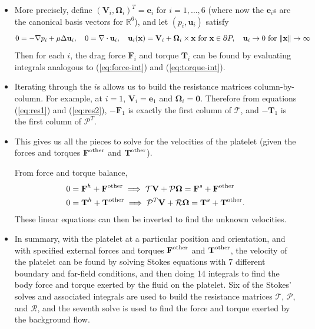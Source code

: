 \documentclass{article}
\newcommand{\tn}{\textnormal}
\newcommand{\vect}[1]{\boldsymbol{\mathbf{#1}}}
\def\R{\mathbb{R}}
\begin{document}
{\begin{itemize}
  Note the change in sign: because of the way the resistance matrices
  are defined, $\mathcal{T} \vect{V}$ is the force exerted \emph{by
    the platelet on the fluid} and $-\mathcal{T} \vect{V}$ is the
  force exerted \emph{by the fluid on the platelet}. 
\item More precisely, define
  $(\vect{V}_i, \vect{\Omega}_i)^T = \vect{e}_i$ for
  $i = 1, \hdots, 6$ (where now the $\vect{e}_i$s are the canonical
  basis vectors for $\R^6$), and let $(p_i, \vect{u}_i)$ satisfy
  \begin{equation}
    \label{eq:unit-cmp}
    0 = -\nabla p_i + \mu \Delta \vect{u}_i, \quad 0 = \nabla
    \cdot \vect{u}_i, \quad \vect{u}_i(\vect{x}) =
    \vect{V}_i + \vect{\Omega}_i \times \vect{x} \tn{
      for } \vect{x} \in \partial P, \quad \vect{u}_i
    \rightarrow 0 \tn{ for } \|\mathbf{x}\| \rightarrow
    \infty
  \end{equation}
  Then for each $i$, the drag force $\vect{F}_i$ and torque
  $\vect{T}_i$ can be found by evaluating integrals analogous to
  (\ref{eq:force-int}) and (\ref{eq:torque-int}).
\item Iterating through the $i$s allows us to build the resistance
  matrices column-by-column. For example, at $i = 1$, $\vect{V}_i =
  \vect{e}_1$ and $\vect{\Omega}_i = \vect{0}$. Therefore from
  equations (\ref{eq:res1}) and (\ref{eq:res2}), $-\vect{F}_1$ is
  exactly the first column of $\mathcal{T}$, and $-\vect{T}_1$ is the
  first column of $\mathcal{P}^T$.
\item This gives us all the pieces to solve for the velocities of the
  platelet (given the forces and torques $\vect{F}^\tn{other}$
  and $\vect{T}^\tn{other}$).

  From force and torque balance,
  \begin{align}
    0 &= \vect{F}^h + \vect{F}^\tn{other} \implies \mathcal{T}
        \vect{V} + \mathcal{P} \vect{\Omega} = \vect{F}^s +
        \vect{F}^\tn{other} \\
    0 &= \vect{T}^h + \vect{T}^\tn{other} \implies \mathcal{P}^T
        \vect{V} + \mathcal{R} \vect{\Omega} = \vect{T}^s +
        \vect{T}^\tn{other}.
  \end{align}
  These linear equations can then be inverted to find the unknown
  velocities.
\item In summary, with the platelet at a particular position and
  orientation, and with specified external forces and torques
  $\vect{F}^\tn{other}$ and $\vect{T}^\tn{other}$, the velocity of the
  platelet can be found by solving Stokes equations with 7 different
  boundary and far-field conditions, and then doing 14 integrals to
  find the body force and torque exerted by the fluid on the
  platelet. Six of the Stokes' solves and associated integrals are
  used to build the resistance matrices $\mathcal{T}$, $\mathcal{P}$,
  and $\mathcal{R}$, and the seventh solve is used to find the force
  and torque exerted by the background flow.
\end{itemize}
}
\end{document}

